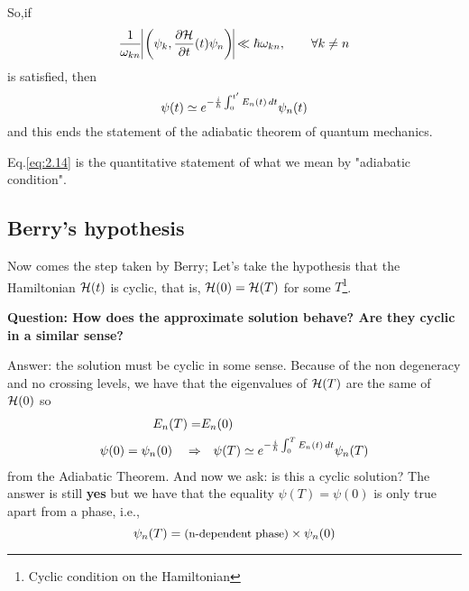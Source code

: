 So,if
\begin{equation}
\frac{1}{\omega_{kn}} \vline\left(\psi_k,\pd{\Ham}{t}(t)\psi_n\right)\vline \ll\hbar\omega_{kn}, \qquad \forall k\neq n
\label{eq:2.14}
\end{equation}
is satisfied, then
\begin{equation}
\psi(t)\simeq e^{-\frac{i}{\hbar}\int_{0}^{t'}E_n(t)\mathop{}\!d t}\psi_n(t)
\end{equation}
and this ends the statement of the adiabatic theorem of quantum mechanics.
\begin{rem}
	Eq.\eqref{eq:2.14} is the quantitative statement of what we mean by "adiabatic condition".
\end{rem}

\subsection{Berry's hypothesis}
Now comes the step taken by Berry; Let's take the hypothesis that the Hamiltonian $ \mathcal{H}(t) $ is cyclic, that is, $ \mathcal{H}(0)=\mathcal{H}(T) $ for some $ T $\footnote{Cyclic condition on the Hamiltonian}.
\begin{center}
	\textbf{Question: How does the approximate solution behave? Are they cyclic in a similar sense?}
\end{center}
Answer: the solution must be cyclic in some sense. Because of the non degeneracy and no crossing levels, we have that the eigenvalues of $ \mathcal{H}(T) $ are the same of $ \mathcal{H}(0) $ so
\begin{align}
E_n(T)=&E_n(0)\\
\psi(0)=\psi_n(0)\quad\Rightarrow& \quad\psi(T)\simeq e^{-\frac{i}{\hbar}\int_{0}^{T}E_n(t)\mathop{}\!d t}\psi_n(T)
\end{align}
from the Adiabatic Theorem. And now we ask: is this a cyclic solution? The answer is still \textbf{yes} but we have that the equality $ \psi(T)=\psi(0) $ is only true apart from a phase, i.e., 
\begin{equation}
\psi_n(T)=\text{\small (n-dependent phase)}\times\psi_n(0)
\label{eq:2.18}
\end{equation}


